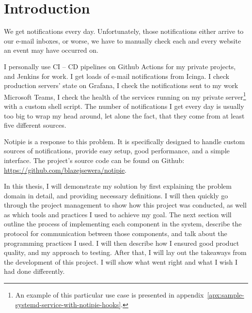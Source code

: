 \section{Introduction}\label{sec:introduction}

We get notifications every day.
Unfortunately,
those notifications either arrive
to our e-mail inboxes,
or worse,
we have to manually check
each and every website an event may have occurred on.

I personally use \ac{CI} -- \ac{CD} pipelines
on Github Actions for my private projects,
and Jenkins for work.
I get loads of e-mail notifications from Icinga.
I check production servers' state on Grafana,
I check the notifications sent to my work Microsoft Teams,
I check the health of the services
running on my private server\footnote{
  An example of this particular use case
  is presented in appendix~\ref{apx:sample-systemd-service-with-notipie-hooks}.
} with a custom shell script.
The number of notifications I get every day
is usually too big to wrap my head around,
let alone the fact,
that they come from at least five different sources.

Notipie is a response to this problem.
It is specifically designed
to handle custom sources of notifications,
provide easy setup,
good performance,
and a simple interface.
The project's source code can be found
on Github: \url{https://github.com/blazejsewera/notipie}.

In this thesis,
I will demonstrate my solution
by first explaining the problem domain in detail,
and providing necessary definitions.
I will then quickly go through
the project management
to show how this project was conducted,
as well as which tools and practices
I used to achieve my goal.
The next section
will outline the process of implementing
each component in the system,
describe the protocol for communication
between those components,
and talk about the programming practices I used.
I will then describe how I ensured
good product quality,
and my approach to testing.
After that,
I will lay out the takeaways from the development
of this project.
I will show what went right
and what I wish I had done differently.


